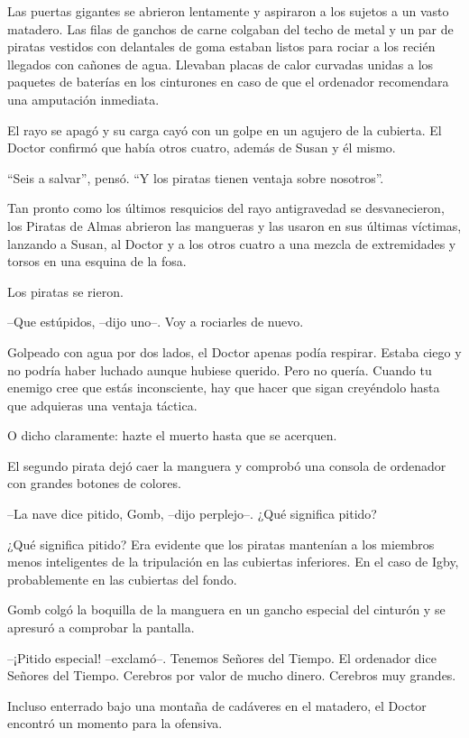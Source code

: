Las puertas gigantes se abrieron lentamente y aspiraron a los sujetos a un vasto matadero. Las filas de ganchos de carne colgaban del techo de metal y un par de piratas vestidos con delantales de goma estaban listos para rociar a los recién llegados con cañones de agua. Llevaban placas de calor curvadas unidas a los paquetes de baterías en los cinturones en caso de que el ordenador recomendara una amputación inmediata.

El rayo se apagó y su carga cayó con un golpe en un agujero de la cubierta. El Doctor confirmó que había otros cuatro, además de Susan y él mismo.

``Seis a salvar'', pensó. ``Y los piratas tienen ventaja sobre nosotros''.

Tan pronto como los últimos resquicios del rayo antigravedad se desvanecieron, los Piratas de Almas abrieron las mangueras y las usaron en sus últimas víctimas, lanzando a Susan, al Doctor y a los otros cuatro a una mezcla de extremidades y torsos en una esquina de la fosa.

Los piratas se rieron. 

--Que estúpidos, --dijo uno--. Voy a rociarles de nuevo.

Golpeado con agua por dos lados, el Doctor apenas podía respirar. Estaba ciego y no podría haber luchado aunque hubiese querido. Pero no quería. Cuando tu enemigo cree que estás inconsciente, hay que hacer que sigan creyéndolo hasta que adquieras una ventaja táctica.

O dicho claramente: hazte el muerto hasta que se acerquen.

El segundo pirata dejó caer la manguera y comprobó una consola de ordenador con grandes botones de colores.

--La nave dice pitido, Gomb, --dijo perplejo--. ¿Qué significa pitido?

¿Qué significa pitido? Era evidente que los piratas mantenían a los miembros menos inteligentes de la tripulación en las cubiertas inferiores. En el caso de Igby, probablemente en las cubiertas del fondo.

Gomb colgó la boquilla de la manguera en un gancho especial del cinturón y se apresuró a comprobar la pantalla.

--¡Pitido especial! --exclamó--. Tenemos Señores del Tiempo. El ordenador dice Señores del Tiempo. Cerebros por valor de mucho dinero. Cerebros muy grandes.

Incluso enterrado bajo una montaña de cadáveres en el matadero, el Doctor encontró un momento para la ofensiva.

